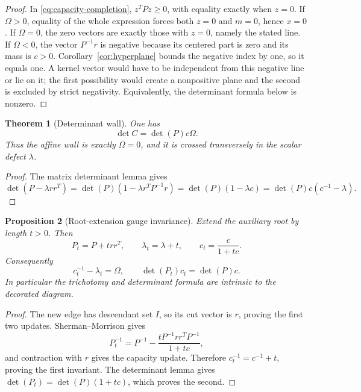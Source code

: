 \documentclass[11pt,a4paper]{amsart}
\theoremstyle{plain}
\newtheorem{theorem}{Theorem}[section]
\newtheorem{proposition}[theorem]{Proposition}
\theoremstyle{definition}
\begin{document}
\begin{proof}
In \eqref{eq:capacity-completion}, $z^TPz\ge0$, with equality exactly when $z=0$.
If $\Omega>0$, equality of the whole expression forces both $z=0$ and $m=0$, hence $x=0$.
If $\Omega=0$, the zero vectors are exactly those with $z=0$, namely the stated line.
If $\Omega<0$, the vector $P^{-1}r$ is negative because its centered part is zero and its mass is
$c>0$.  Corollary~\ref{cor:hyperplane} bounds the negative index by one, so it equals one.  A kernel
vector would have to be independent from this negative line or lie on it; the first possibility
would create a nonpositive plane and the second is excluded by strict negativity.  Equivalently,
the determinant formula below is nonzero.
\end{proof}

\begin{theorem}[Determinant wall]\label{thm:determinant}
One has
\begin{equation}\label{eq:determinant}
                   \boxed{\quad\det C=\det(P)c\Omega.\quad}
\end{equation}
Thus the affine wall is exactly $\Omega=0$, and it is crossed transversely in the scalar defect
$\lambda$.
\end{theorem}

\begin{proof}
The matrix determinant lemma gives
\[
 \det(P-\lambda rr^T)=\det(P)(1-\lambda r^TP^{-1}r)
 =\det(P)(1-\lambda c)=\det(P)c(c^{-1}-\lambda).
\]
\end{proof}

\begin{proposition}[Root-extension gauge invariance]\label{prop:root-invariance}
Extend the auxiliary root by length $t>0$.  Then
\begin{equation}\label{eq:root-update}
 P_t=P+t rr^T,\qquad \lambda_t=\lambda+t,\qquad
 c_t=\frac{c}{1+tc}.
\end{equation}
Consequently
\begin{equation}\label{eq:root-invariants}
 c_t^{-1}-\lambda_t=\Omega,\qquad
 \det(P_t)c_t=\det(P)c.
\end{equation}
In particular the trichotomy and determinant formula are intrinsic to the decorated diagram.
\end{proposition}

\begin{proof}
The new edge has descendant set $I$, so its cut vector is $r$, proving the first two updates.
Sherman--Morrison gives
\[
 P_t^{-1}=P^{-1}-\frac{tP^{-1}rr^TP^{-1}}{1+tc},
\]
and contraction with $r$ gives the capacity update.  Therefore
$c_t^{-1}=c^{-1}+t$, proving the first invariant.  The determinant lemma gives
$\det(P_t)=\det(P)(1+tc)$, which proves the second.
\end{proof}
\end{document}
